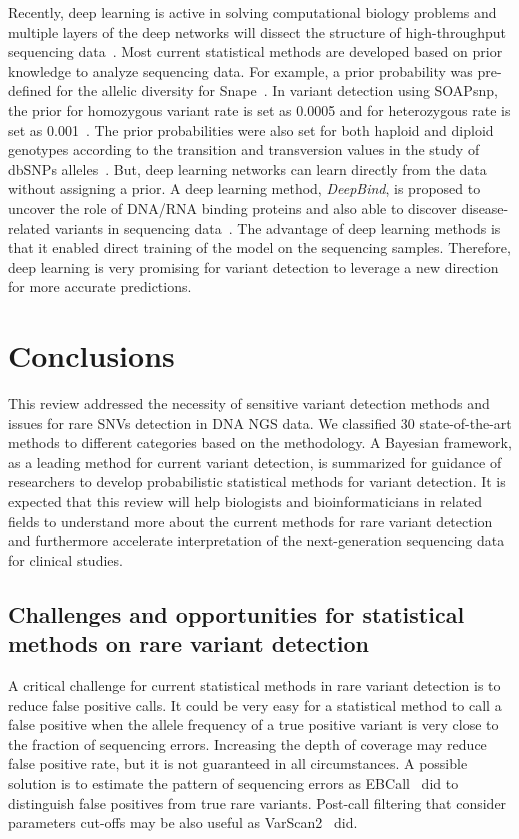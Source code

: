 \documentclass[a4,center,fleqn]{NAR}
\begin{document}
Recently, deep learning is active in solving computational biology problems and multiple layers of the deep networks will dissect the structure of high-throughput sequencing data~\citep{angermueller2016deep}.
Most current statistical methods are developed based on prior knowledge to analyze sequencing data.
For example, a prior probability was pre-defined for the allelic diversity for Snape~\citep{Raineri2012}.
In variant detection using SOAPsnp, the prior for homozygous variant rate is set as 0.0005 and for heterozygous rate is set as 0.001~\citep{Li2009}.
The prior probabilities were also set for both haploid and diploid genotypes according to the transition and transversion values in the study of dbSNPs alleles~\citep{zhao2002neighboring}. 
But, deep learning networks can learn directly from the data without assigning a prior.
A deep learning method, \textit{DeepBind}, is proposed to uncover the role of DNA/RNA binding proteins and also able to discover disease-related variants in sequencing data~\citep{alipanahi2015predicting}.
The advantage of deep learning methods is that it enabled direct training of the model on the sequencing samples.
Therefore, deep learning is very promising for variant detection to leverage a new direction for more accurate predictions.




\section{Conclusions}

This review addressed the necessity of sensitive variant detection methods and issues for rare SNVs detection in DNA NGS data.
We classified 30 state-of-the-art methods to different categories based on the methodology.
A Bayesian framework, as a leading method for current variant detection, is summarized for guidance of researchers to develop probabilistic statistical methods for variant detection.
It is expected that this review will help biologists and bioinformaticians in related fields to understand more about the current methods for rare variant detection and furthermore accelerate interpretation of the next-generation sequencing data for clinical studies. 


\subsection{Challenges and opportunities for statistical methods on rare variant detection}

A critical challenge for current statistical methods in rare variant detection is to reduce false positive calls.
It could be very easy for a statistical method to call a false positive when the allele frequency of a true positive variant is very close to the fraction of sequencing errors.
Increasing the depth of coverage may reduce false positive rate, but it is not guaranteed in all circumstances.
A possible solution is to estimate the pattern of sequencing errors as EBCall~\citep{Shiraishi2013} did to distinguish false positives from true rare variants.
Post-call filtering that consider parameters cut-offs may be also useful as VarScan2~\citep{Koboldt2012} did.
\end{document}
